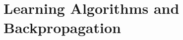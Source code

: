 \renewcommand{\prevpart}{3 }
\renewcommand{\thispart}{4 }
\renewcommand{\nextpart}{5 }

\section{Learning Algorithms and Backpropagation}




